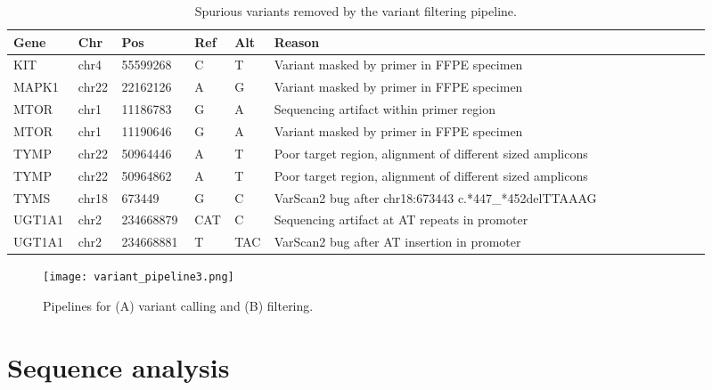 \newpage
\begin{longtable}{p{0.08\linewidth}p{0.05\linewidth}p{0.1\linewidth}p{0.04\linewidth}p{0.04\linewidth}p{0.6\linewidth}}
    \caption{Spurious variants removed by the variant filtering pipeline.}
    \label{tbl:spurious_calls}
        \\
        \hline
        Gene & Chr & Pos & Ref & Alt & Reason
				\\
				\hline
				KIT & chr4 & 55599268 & C & T & Variant masked by primer in FFPE specimen
				\\
        MAPK1 & chr22 & 22162126 & A & G & Variant masked by primer in FFPE specimen
        \\
        MTOR & chr1 & 11186783 & G & A & Sequencing artifact within primer region
        \\
        MTOR & chr1 & 11190646 & G & A & Variant masked by primer in FFPE specimen
        \\
        TYMP & chr22 & 50964446 & A & T & Poor target region, alignment of different sized amplicons
        \\
        TYMP & chr22 & 50964862 & A & T & Poor target region, alignment of different sized amplicons
        \\
        TYMS & chr18 & 673449 & G & C & VarScan2 bug after chr18:673443 c.*447\_*452delTTAAAG
        \\
        UGT1A1 & chr2 & 234668879 & CAT & C & Sequencing artifact at AT repeats in promoter
        \\
        UGT1A1 & chr2 & 234668881 & T & TAC & VarScan2 bug after AT insertion in promoter
        \\
				\hline
\end{longtable}


\begin{figure}[H]
\centering
	\texttt{[image: variant\_pipeline3.png]}
	\caption{Pipelines for (A) variant calling and (B) filtering.}
	\label{fig:variant_pipeline}
\end{figure}

\newpage
\section{Sequence analysis}
\label{sec:Sequenceanalysis}

